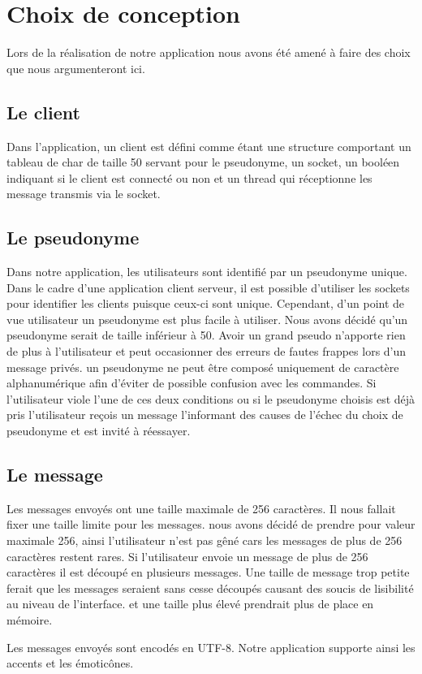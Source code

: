 \section{Choix de conception}
Lors de la réalisation de notre application nous avons été amené à faire des choix que nous argumenteront ici.
\subsection{Le client}
Dans l'application, un client est défini comme étant une structure comportant un tableau de char de taille 50 servant pour le pseudonyme, un socket, un booléen indiquant si le client est connecté ou non et un thread qui réceptionne les message transmis via le socket.
\subsection{Le pseudonyme}
Dans notre application, les utilisateurs sont identifié par un pseudonyme unique. Dans le cadre d'une application client serveur, il est possible d'utiliser les sockets pour identifier les clients puisque ceux-ci sont unique. Cependant, d'un point de vue utilisateur un pseudonyme est plus facile à utiliser. Nous avons décidé qu'un pseudonyme serait de taille inférieur à 50. Avoir un grand pseudo n'apporte rien de plus à l'utilisateur et peut occasionner des erreurs de fautes frappes lors d'un message privés. un pseudonyme ne peut être composé uniquement de caractère alphanumérique afin d'éviter de possible confusion avec les commandes. Si l'utilisateur viole l'une de ces deux conditions ou si le pseudonyme choisis est déjà pris l'utilisateur reçois un message l'informant des causes de l'échec du choix de pseudonyme et est invité à réessayer.  
\subsection{Le message}
Les messages envoyés ont une taille maximale de 256 caractères. Il nous fallait fixer une taille limite pour les messages. nous avons décidé de prendre pour valeur maximale 256, ainsi l'utilisateur n'est pas gêné cars les messages de plus de 256 caractères restent rares. Si l'utilisateur envoie un message de plus de 256 caractères il est découpé en plusieurs messages. Une taille de message trop petite ferait que les messages seraient sans cesse découpés causant des soucis de lisibilité au niveau de l'interface. et une taille plus élevé prendrait plus de place en mémoire.

Les messages envoyés sont encodés en UTF-8. Notre application supporte ainsi les accents et les émoticônes.
